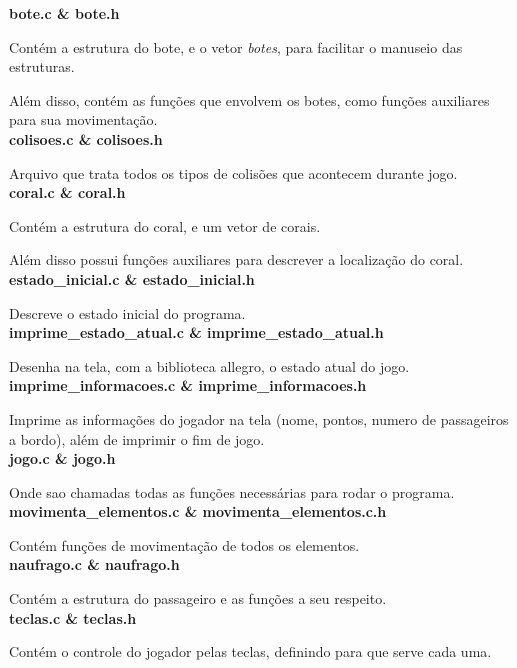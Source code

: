 \documentclass[12pt,a4paper]{article}
\begin{document}
\textbf{bote.c \& bote.h}

Contém a estrutura do bote, e o vetor \emph{botes}, para facilitar o manuseio das estruturas.

Além disso, contém as funções que envolvem os botes, como funções auxiliares para sua movimentação.\\

\textbf{colisoes.c \& colisoes.h}

Arquivo que trata todos os tipos de colisões que acontecem durante jogo.\\

\textbf{coral.c \& coral.h}

Contém a estrutura do coral, e um vetor de corais.

Além disso possui funções auxiliares para descrever a localização do coral.\\

\textbf{estado\_inicial.c \& estado\_inicial.h}

Descreve o estado inicial do programa.\\

\textbf{imprime\_estado\_atual.c \& imprime\_estado\_atual.h}

Desenha na tela, com a biblioteca allegro, o estado atual do jogo.\\

\textbf{imprime\_informacoes.c \& imprime\_informacoes.h}

Imprime as informações do jogador na tela (nome, pontos, numero de passageiros a bordo), além de imprimir o fim de jogo.\\

\textbf{jogo.c \& jogo.h}

Onde sao chamadas todas as funções necessárias para rodar o programa.\\

\textbf{movimenta\_elementos.c \& movimenta\_elementos.c.h}

Contém funções de movimentação de todos os elementos.\\

\textbf{naufrago.c \& naufrago.h}

Contém a estrutura do passageiro e as funções a seu respeito.\\

\textbf{teclas.c \& teclas.h}

Contém o controle do jogador pelas teclas, definindo para que serve cada uma.\\
\end{document}
